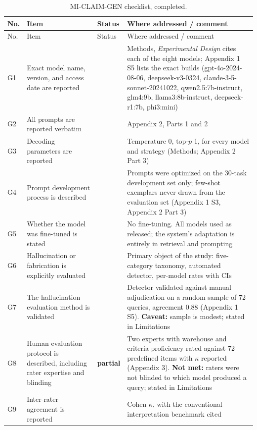 \documentclass[10pt]{article}
\newcommand{\Y}{\checkmark}
\begin{document}
\vspace{4pt}
\begingroup\footnotesize
\begin{longtable}{@{}L{0.7cm}L{7.4cm}C{1.4cm}L{5.4cm}@{}}
\caption{MI-CLAIM-GEN checklist, completed.}\\
\toprule
No. & Item & Status & Where addressed / comment\\
\midrule
\endfirsthead
\toprule
No. & Item & Status & Where addressed / comment\\
\midrule
\endhead
\bottomrule
\endfoot
\bottomrule
\endlastfoot

G1 & Exact model name, version, and access date are reported & \Y & Methods, \emph{Experimental Design} cites each of the eight models; Appendix 1 S5 lists the exact builds (gpt-4o-2024-08-06, deepseek-v3-0324, claude-3-5-sonnet-20241022, qwen2.5:7b-instruct, glm4:9b, llama3:8b-instruct, deepseek-r1:7b, phi3:mini)\\
G2 & All prompts are reported verbatim & \Y & Appendix 2, Parts 1 and 2\\
G3 & Decoding parameters are reported & \Y & Temperature 0, top-$p$ 1, for every model and strategy (Methods; Appendix 2 Part 3)\\
G4 & Prompt development process is described & \Y & Prompts were optimized on the 30-task development set only; few-shot exemplars never drawn from the evaluation set (Appendix 1 S3, Appendix 2 Part 3)\\
G5 & Whether the model was fine-tuned is stated & \Y & No fine-tuning. All models used as released; the system's adaptation is entirely in retrieval and prompting\\
G6 & Hallucination or fabrication is explicitly evaluated & \Y & Primary object of the study: five-category taxonomy, automated detector, per-model rates with CIs\\
G7 & The hallucination evaluation method is validated & \Y & Detector validated against manual adjudication on a random sample of 72 queries, agreement 0.88 (Appendix 1 S5). \textbf{Caveat:} sample is modest; stated in Limitations\\
G8 & Human evaluation protocol is described, including rater expertise and blinding & \textbf{partial} & Two experts with warehouse and criteria proficiency rated against 72 predefined items with $\kappa$ reported (Appendix 3). \textbf{Not met:} raters were not blinded to which model produced a query; stated in Limitations\\
G9 & Inter-rater agreement is reported & \Y & Cohen $\kappa$, with the conventional interpretation benchmark cited\\

\end{longtable}
\end{document}
